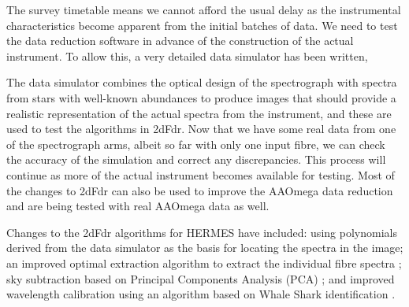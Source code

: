 The survey timetable means we cannot afford the usual delay as the instrumental characteristics become apparent from the initial batches of data. We need to test the data reduction software in advance of the construction of the actual instrument. To allow this, a very detailed data simulator has been written,

The data simulator combines the optical design of the spectrograph with spectra from stars with well-known abundances to produce images that should provide a realistic representation of the actual spectra from the instrument, and these are used to test the algorithms in 2dFdr. Now that we have some real data from one of the spectrograph arms, albeit so far with only one input fibre, we can check the accuracy of the simulation and correct any discrepancies. This process will continue as more of the actual instrument becomes available for testing. Most of the changes to 2dFdr can also be used to improve the AAOmega data reduction and are being tested with real AAOmega data as well.

Changes to the 2dFdr algorithms for HERMES have included: using polynomials derived from the data simulator as the basis for locating the spectra in the image; an improved optimal extraction algorithm to extract the individual fibre spectra \citep{OptExt_2010}; sky subtraction based on Principal Components Analysis (PCA) \citep{PCA_2010}; and improved wavelength calibration using an algorithm based on Whale Shark identification \citep{Sharks_2005}.


